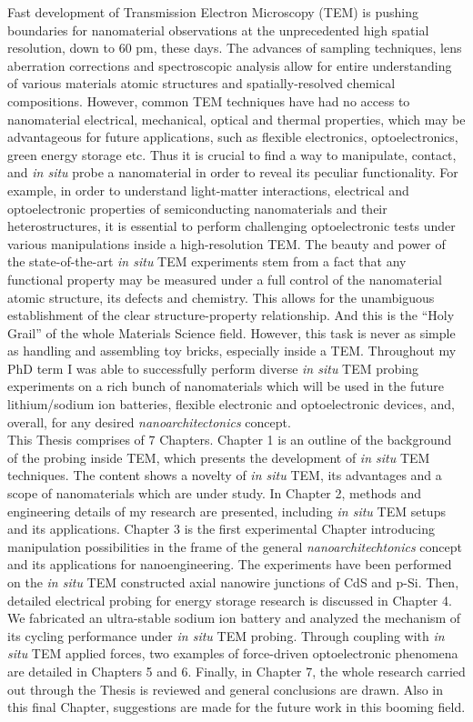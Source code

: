 \justify

Fast development of Transmission Electron Microscopy (TEM) is pushing boundaries for nanomaterial observations at the unprecedented high spatial resolution, down to 60 pm, these days. The advances of sampling techniques, lens aberration corrections and spectroscopic analysis allow for entire understanding of various materials atomic structures and spatially-resolved chemical compositions. However, common TEM techniques have had no access to nanomaterial electrical, mechanical, optical and thermal properties, which may be advantageous for future applications, such as flexible electronics, optoelectronics, green energy storage etc. Thus it is crucial to find a way to manipulate, contact, and \textit{in situ} probe a nanomaterial in order to reveal its peculiar functionality. For example, in order to understand light-matter interactions, electrical and optoelectronic properties of semiconducting nanomaterials and their heterostructures, it is essential to perform challenging optoelectronic tests under various manipulations inside a high-resolution TEM. The beauty and power of the state-of-the-art \textit{in situ} TEM experiments stem from a fact that any functional property may be measured under a full control of the nanomaterial atomic structure, its defects and chemistry. This allows for the unambiguous establishment of the clear structure-property relationship. And this is the “Holy Grail” of the whole Materials Science field. However, this task is never as simple as handling and assembling toy bricks, especially inside a TEM. Throughout my PhD term I was able to successfully perform diverse \textit{in situ} TEM probing experiments on a rich bunch of nanomaterials which will be used in the future lithium/sodium ion batteries, flexible electronic and optoelectronic devices, and, overall, for any desired \textit{nanoarchitectonics} concept. \\
This Thesis comprises of 7 Chapters. Chapter 1 is an outline of the background of the probing inside TEM, which presents the development of \textit{in situ} TEM techniques. The content shows a novelty of {\it in situ} TEM, its advantages and a scope of nanomaterials which are under study. In Chapter 2, methods and engineering details of my research are presented, including {\it in situ} TEM setups and its applications. Chapter 3 is the first experimental Chapter introducing manipulation possibilities in the frame of the general {\it nanoarchitechtonics} concept and its applications for nanoengineering. The experiments have been performed on the {\it in situ} TEM constructed axial nanowire junctions of CdS and p-Si. Then, detailed electrical probing for energy storage research is discussed in Chapter 4. We fabricated an ultra-stable sodium ion battery and analyzed the mechanism of its cycling performance under {\it in situ} TEM probing. Through coupling with {\it in situ} TEM applied forces, two examples of force-driven optoelectronic phenomena are detailed in Chapters 5 and 6. Finally, in Chapter 7, the whole research carried out through the Thesis is reviewed and general conclusions are drawn. Also in this final Chapter, suggestions are made for the future work in this booming field. 
